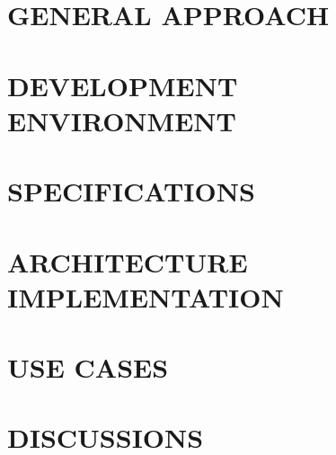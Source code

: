 \documentclass[conference]{IEEEtran}
\begin{document}
\section{GENERAL APPROACH}
\section{DEVELOPMENT ENVIRONMENT}
\section{SPECIFICATIONS}
\section{ARCHITECTURE IMPLEMENTATION}
\section{USE CASES}
\section{DISCUSSIONS}
\end{document}
